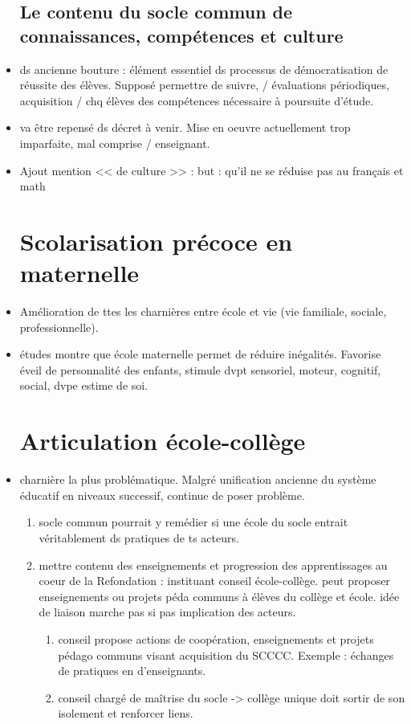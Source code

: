 \documentclass[12pt]{report}
\begin{document}
\begin{itemize}
\subsection{Le contenu du socle commun de connaissances, compétences et culture}

\item ds ancienne bouture : élément essentiel ds processus de démocratisation de réussite des élèves. Supposé permettre de suivre, / évaluations périodiques, acquisition / chq élèves des compétences nécessaire à poursuite d'étude.\\
\item va être repensé ds décret à venir. Mise en oeuvre actuellement trop imparfaite, mal comprise / enseignant. \\
\item Ajout mention << de culture >> : but : qu'il ne se réduise pas au français et math

\section{Scolarisation précoce en maternelle}

\item Amélioration de ttes les charnières entre école et vie (vie familiale, sociale, professionnelle).
\item études montre que école maternelle permet de réduire inégalités. Favorise éveil de personnalité des enfants, stimule dvpt sensoriel, moteur, cognitif, social, dvpe estime de soi.

\section{Articulation école-collège}

\item charnière la plus problématique. Malgré unification ancienne du système éducatif en niveaux successif, continue de poser problème.
\begin{enumerate}
\item socle commun pourrait y remédier si une école du socle entrait véritablement ds pratiques de ts acteurs.\\
\item mettre contenu des enseignements et progression des apprentissages au coeur de la Refondation : instituant conseil école-collège. peut proposer enseignements ou projets péda communs à élèves du collège et école. idée de liaison marche pas si pas implication des acteurs. \\
\begin{enumerate}
\item conseil propose actions de coopération, enseignements et projets pédago communs visant acquisition du SCCCC. Exemple : échanges de pratiques en d'enseignants. \\
\item conseil chargé de maîtrise du socle -> collège unique doit sortir de son isolement et renforcer liens.


\end{enumerate}
\end{enumerate}
\end{itemize}
\end{document}
